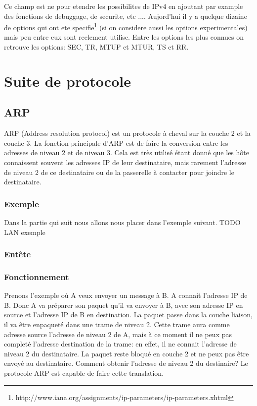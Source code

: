\documentclass[twoside,openright,a4paper,11pt,french]{article}
\begin{document}
\begin{description}
Ce champ est ne pour etendre les possibilites de IPv4 en ajoutant par example 
des fonctions de debuggage, de securite, etc ....
Aujord'hui il y a quelque dizaine de options qui ont ete specifie\footnote
{http://www.iana.org/assignments/ip-parameters/ip-parameters.xhtml} (si on
considere aussi les options experimentales) mais peu entre eux sont reelement
utilise. 
Entre les options les plus connues on retrouve les options:
SEC, TR, MTUP et MTUR, TS et RR.














\end{description}



\section{Suite de protocole}

\subsection{ARP}
ARP (Address resolution protocol) est un protocole à cheval sur la couche 2 et
la couche 3. La fonction principale d'ARP est de faire la conversion entre les
adresses de niveau 2 et de niveau 3. Cela est très utilisé étant donné que les
hôte connaissent souvent les adresses IP de leur destinataire, mais rarement
l'adresse de niveau 2 de ce destinataire ou de la passerelle à contacter pour joindre
le destinataire.

\subsubsection{Exemple}
Dans la partie qui suit nous allons nous placer dans l'exemple suivant.
TODO LAN exemple
\subsubsection{Entête}

\subsubsection{Fonctionnement}
Prenons l'exemple où A veux envoyer un message à B. A connait l'adresse IP de
B. Donc A va préparer son paquet qu'il va envoyer à B, avec son adresse IP en
source et l'adresse IP de B en destination. La paquet passe dans la couche
liaison, il va être enpaqueté dans une trame de niveau 2. Cette trame aura
comme adresse source l'adresse de niveau 2 de A, mais à ce moment il ne peux
pas completé l'adresse destination de la trame: en effet, il ne connait
l'adresse de niveau 2 du destinataire. La paquet reste bloqué en couche 2 et ne
peux pas être envoyé au destinataire. Comment obtenir l'adresse de niveau 2 du destinaire?
Le protocole ARP est capable de faire cette translation.
\end{document}
